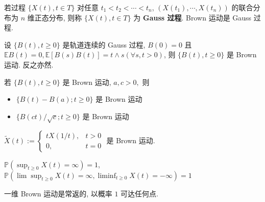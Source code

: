 \documentclass[10pt]{yerbaformat}
\begin{document}
\begin{definition}[Gauss 过程]
    若过程 $\{X(t), t \in T\}$ 对任意 $t_{1}<t_{2}<\cdots<t_{n}$, $
\left(X\left(t_{1}\right), \cdots, X\left(t_{n}\right)\right)$ 的联合分布为 $n$ 维正态分布, 则称 $\{X(t), t \in T\}$ 为 \textbf{Gauss 过程}. Brown 运动是 Gauss 过程.
\end{definition}

\begin{theorem}
    设 $\{B(t), t \geq 0\}$ 是轨道连续的 Gauss 过程, $B(0)=0$ 且 $ \mathbb{E} B(t)=0, \mathbb{E}[B(s) B(t)]=t \wedge s(\forall s, t>0)$, 则 $\{B(t), t \geq 0\}$ 是 Brown 运动. 反之亦然.
\end{theorem}

\begin{theorem}[不变性]
    若 $\{B(t), t \geq 0\}$ 是 Brown 运动, $a, c>0,$ 则 
    \begin{itemize}
        \item $\{B(t)-B(a) ; t \geq 0\}$ 是 Brown 运动
        \item $\{B(c t) / \sqrt{c} ; t \geq 0\}$ 是 Brown 运动
    \end{itemize} 
\end{theorem}

\begin{theorem}
    $\tilde{X}(t):=\left\{\begin{array}{ll}t X(1 / t), & t>0 \\ 0, & t=0\end{array}\right.$ 是 Brown 运动.
\end{theorem}

\begin{theorem}
    $\mathbb{P}\left(\sup _{t \geq 0} X(t)=\infty\right)=1$, $\mathbb{P}\left(\lim \sup _{t \geq 0} X(t)=\infty, \liminf _{t \geq 0} X(t)=-\infty\right)=1$
\end{theorem}

\begin{lemma}
    一维 Brown 运动是常返的, 以概率 $1$ 可达任何点.
\end{lemma}
\end{document}
